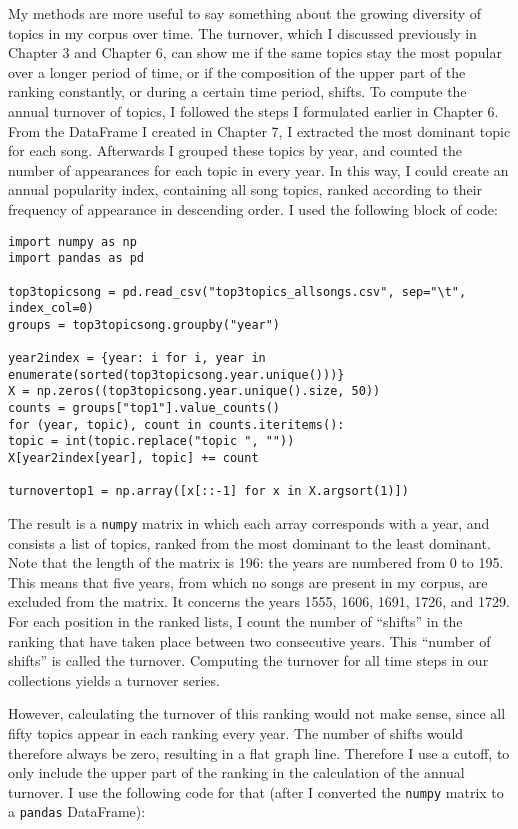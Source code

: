 My methods are more useful to say something about the growing diversity of topics in my corpus over time. The turnover, which I discussed previously in Chapter 3 and Chapter 6, can show me if the same topics stay the most popular over a longer period of time, or if the composition of the upper part of the ranking constantly, or during a certain time period, shifts. To compute the annual turnover of topics, I followed the steps I formulated earlier in Chapter 6. From the DataFrame I created in Chapter 7, I extracted the most dominant topic for each song. Afterwards I grouped these topics by year, and counted the number of appearances for each topic in every year. In this way, I could create an annual popularity index, containing all song topics, ranked according to their frequency of appearance in descending order. I used the following block of code:

\begin{lstlisting}
import numpy as np
import pandas as pd

top3topicsong = pd.read_csv("top3topics_allsongs.csv", sep="\t", index_col=0)
groups = top3topicsong.groupby("year")

year2index = {year: i for i, year in enumerate(sorted(top3topicsong.year.unique()))}
X = np.zeros((top3topicsong.year.unique().size, 50))
counts = groups["top1"].value_counts()
for (year, topic), count in counts.iteritems():
topic = int(topic.replace("topic ", ""))
X[year2index[year], topic] += count

turnovertop1 = np.array([x[::-1] for x in X.argsort(1)])
\end{lstlisting}

\noindent The result is a \texttt{numpy} matrix in which each array corresponds with a year, and consists a list of topics, ranked from the most dominant to the least dominant. Note that the length of the matrix is 196: the years are numbered from 0 to 195. This means that five years, from which no songs are present in my corpus, are excluded from the matrix. It concerns the years 1555, 1606, 1691, 1726, and 1729. For each position in the ranked lists, I count the number of \enquote{shifts} in the ranking that have taken place between two consecutive years. This \enquote{number of shifts} is called the turnover. Computing the turnover for all time steps in our collections yields a turnover series.

However, calculating the turnover of this ranking would not make sense, since all fifty topics appear in each ranking every year. The number of shifts would therefore always be zero, resulting in a flat graph line. Therefore I use a cutoff, to only include the upper part of the ranking in the calculation of the annual turnover. I use the following code for that (after I converted the \texttt{numpy} matrix to a \texttt{pandas} DataFrame):

